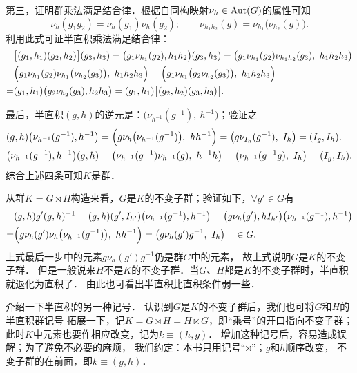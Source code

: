 第三，证明群乘法满足结合律．根据自同构映射$\nu_h\in {\rm Aut}(G)$的属性可知
\begin{equation}
    \nu_{h} (g_1 g_2) = \nu_{h}(g_1) \nu_{h}(g_2); \qquad
    \nu_{h_1 h_2} (g) = \nu_{h_1}\bigl(\nu_{h_2}(g)\bigr) .
\end{equation}
利用此式可证半直积乘法满足结合律：
\begin{align*}
    &\bigl[(g_1, h_1)(g_2, h_2)\bigr] (g_3 ,h_3)
    =\bigl(g_1 \nu_{h_1}(g_2), h_1 h_2\bigr) (g_3, h_3)
    =\bigl( g_1 \nu_{h_1}(g_2) \nu_{h_1 h_2}(g_3) ,\  h_1 h_2 h_3 \bigr) \\
    =&\Bigl( g_1 \nu_{h_1}(g_2) \nu_{h_1}\bigl(\nu_{h_2} (g_3)\bigr) ,\  h_1 h_2 h_3 \Bigr)
    =\Bigl( g_1 \nu_{h_1} \bigl(g_2 \nu_{h_2} (g_3)\bigr)   ,\ h_1 h_2 h_3 \Bigr)\\
    =&( g_1, h_1) \bigl( g_2 \nu_{h_2} (g_3), h_2 h_3 \bigr)
    =( g_1, h_1) \bigl[( g_2, h_2) (g_3, h_3)\bigr].
\end{align*}  %


最后，半直积$(g,h)$的逆元是：$\bigl(\nu_{h^{-1}}(g^{-1}),\ h^{-1}\bigr)$；验证之
\begin{align*}
    &(g,h) \bigl(\nu_{h^{-1}}(g^{-1}), h^{-1}\bigr) 
    = \Bigl(g \nu_{h}\bigl(\nu_{h^{-1}}(g^{-1})\bigr) , \ h h^{-1}\Bigr)
    =\bigl(g \nu_{I_h}(g^{-1}), \ I_h \bigr) = (I_g, I_h) . \\
    &\bigl(\nu_{h^{-1}}(g^{-1}), h^{-1}\bigr)  (g,h)
    =\bigl(\nu_{h^{-1}}(g^{-1}) \nu_{h^{-1}}(g), \ h^{-1} h\bigr) 
    =\bigl(\nu_{h^{-1}}(g^{-1} g) ,\ I_h\bigr) 
    =(I_g , I_h ) .
\end{align*} %
综合上述四条可知$K$是群．

从群$K=G \rtimes H$构造来看，$G$是$K$的不变子群；验证如下，$\forall g'\in G$有
\begin{align*}
    &(g,h) g' (g,h)^{-1} =
    (g,h) (g' , I_{h'}) \bigl(\nu_{h^{-1}}(g^{-1}), h^{-1} \bigr) =
    \bigl( g \nu_h (g'), h I_{h'}\bigr) \bigl(\nu_{h^{-1}}(g^{-1}), h^{-1}\bigr)  \\
    =& \Bigl(g \nu_h (g') \nu_h \bigl(\nu_{h^{-1}}(g^{-1})\bigr),\  h h^{-1}\Bigr) 
    = \bigl(g \nu_h (g') g^{-1},\ I_h\bigr)  \quad \in G.
\end{align*}
上式最后一步中的元素$g \nu_h (g') g^{-1}$仍是群$G$中的元素，
故上式说明$G$是$K$的不变子群．
但是一般说来$H$不是$K$的不变子群．当$G$、$H$都是$K$的不变子群时，半直积就退化为直积了．
由此也可看出半直积比直积条件弱一些．

介绍一下半直积的另一种记号．
认识到$G$是$K$的不变子群后，我们也可将$G$和$H$的{\kaishu  半直积群}记号
拓展一下，记$K=G  \rtimes H =H \ltimes G$，即“乘号”的开口指向不变子群；
此时$K$中元素也要作相应改变，记为$k\equiv (h,g)$．
增加这种记号后，容易造成误解；为了避免不必要的麻烦，
我们约定：本书只用记号“$\rtimes$”；$g$和$h$顺序改变，
不变子群的在前面，即$k\equiv (g,h)$．



